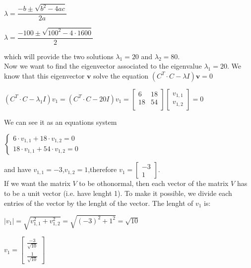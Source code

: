 \begin{center}
		$\lambda=\dfrac{-b\pm\sqrt{b^2-4ac}}{2a}$

\end{center}
\begin{center}
	$\lambda=\dfrac{-100\pm\sqrt{100^2-4\cdot1600}}{2}$
	
\end{center}
which will provide the two solutions $ \lambda_1=20 $ and $\lambda_2=80$.\\
Now we want to find the eigenvector associated to the eigenvalue $ \lambda_1=20 $. We know that this eigenvector $ \textbf{v} $ solve the equation $ (C^T \cdot C-\lambda I)\textbf{v}=0 $ \\
\begin{center}
	$  (C^T \cdot C-\lambda_1 I)v_1= (C^T \cdot C-20 I) v_1= \begin{bmatrix}
	6 &   18 \\
	18  &  54\\
	\end{bmatrix}\begin{bmatrix}v_{1,1}\\v_{1,2}\end{bmatrix}=0 $
\end{center}
We can see it as an equations system
\begin{center}
	
$ \begin{cases} 6\cdot v_{1,1}+18 \cdot v_{1,2}=0 \\
   18\cdot v_{1,1}+54 \cdot v_{1,2}=0 \end{cases} $
\end{center}
and have $ v_{1,1}=-3 $,\quad $ v_{1,2}=1 $,\quad therefore $v_1=\begin{bmatrix}
-3\\
1
\end{bmatrix}$.\\
If we want the matrix $ V $ to be othonormal, then each vector of the matrix $ V $ has to be a unit vector (i.e. have lenght 1). To make it possible, we divide each entries of the vector by the lenght of the vector.
The lenght of $v_1$ is:
\begin{center}
	$ |v_1| = \sqrt{v_{1,1}^2+v_{1,2}^2}=\sqrt{(-3)^2+1^2}=\sqrt{10}$
\end{center}
\begin{center}
	$ v_1=\begin{bmatrix}
	\frac{-3}{\sqrt{10}}\\
	\frac{1}{\sqrt{10}}
	\end{bmatrix} $
\end{center}


